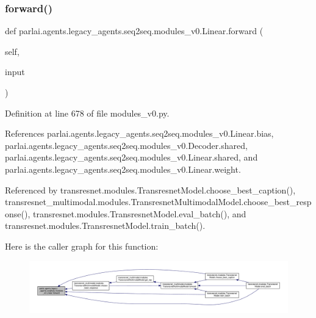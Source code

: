 \subsubsection{\texorpdfstring{forward()}{forward()}}
{\footnotesize\ttfamily def parlai.\+agents.\+legacy\+\_\+agents.\+seq2seq.\+modules\+\_\+v0.\+Linear.\+forward (\begin{DoxyParamCaption}\item[{}]{self,  }\item[{}]{input }\end{DoxyParamCaption})}



Definition at line 678 of file modules\+\_\+v0.\+py.



References parlai.\+agents.\+legacy\+\_\+agents.\+seq2seq.\+modules\+\_\+v0.\+Linear.\+bias, parlai.\+agents.\+legacy\+\_\+agents.\+seq2seq.\+modules\+\_\+v0.\+Decoder.\+shared, parlai.\+agents.\+legacy\+\_\+agents.\+seq2seq.\+modules\+\_\+v0.\+Linear.\+shared, and parlai.\+agents.\+legacy\+\_\+agents.\+seq2seq.\+modules\+\_\+v0.\+Linear.\+weight.



Referenced by transresnet.\+modules.\+Transresnet\+Model.\+choose\+\_\+best\+\_\+caption(), transresnet\+\_\+multimodal.\+modules.\+Transresnet\+Multimodal\+Model.\+choose\+\_\+best\+\_\+response(), transresnet.\+modules.\+Transresnet\+Model.\+eval\+\_\+batch(), and transresnet.\+modules.\+Transresnet\+Model.\+train\+\_\+batch().

Here is the caller graph for this function\+:
\nopagebreak
\begin{figure}[H]
\begin{center}
\leavevmode
\includegraphics[width=350pt]{classparlai_1_1agents_1_1legacy__agents_1_1seq2seq_1_1modules__v0_1_1Linear_a5114a45ac1b8e2a07c399da5bff760be_icgraph}
\end{center}
\end{figure}
\mbox{\label{classparlai_1_1agents_1_1legacy__agents_1_1seq2seq_1_1modules__v0_1_1Linear_a1ec65604d05f105801a61de18d16caa1}} 
